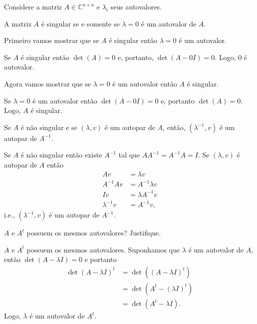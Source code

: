 \documentclass[a4paper,12pt, leqno, answers]{exam}
\begin{document}
\thispagestyle{empty}

\newpage
\setcounter{page}{1}
Considere a matriz $A \in \mathbb{C}^{n \times n}$ e $\lambda_i$ seus autovalores.
\begin{questions}
    \question A matriz $A$ \'{e} singular se e somente se $\lambda = 0$ \'{e} um autovalor de $A$.
    \begin{solution}
        Primeiro vamos mostrar que se $A$ \'{e} singular ent\~{a}o $\lambda = 0$ \'{e} um autovalor.

        Se $A$ \'{e} singular ent\~{a}o $\det(A)=0$ e, portanto, $\det(A - 0I) = 0$. Logo, $0$ \'{e} autovalor.

        Agora vamos mostrar que se $\lambda = 0$ \'{e} um autovalor ent\~{a}o $A$ \'{e} singular.

        Se $\lambda = 0$ \'{e} um autovalor ent\~{a}o $\det(A - 0I) = 0$ e, portanto $\det(A) = 0$. Logo, $A$ \'{e} singular.
    \end{solution}

    \question Se $A$ \'{e} n\~{a}o singular e se $(\lambda, v)$ \'{e} um autopar de $A$, ent\~{a}o, $(\lambda^{-1}, v)$ \'{e} um autopar de $A^{-1}$.
    \begin{solution}
        Se $A$ \'{e} n\~{a}o singular ent\~{a}o existe $A^{-1}$ tal que $A A^{-1} = A^{-1} A = I$. Se $(\lambda, v)$ \'{e} autopar de $A$ ent\~{a}o
        \begin{align*}
            A v &= \lambda v \\
            A^{-1} A v &= A^{-1} \lambda v \\
            I v &= \lambda A^{-1} v \\
            \lambda^{-1} v &= A^{-1} v,
        \end{align*}
        i.e., $(\lambda^{-1}, v)$ \'{e} um autopar de $A^{-1}$.
    \end{solution}

    \question $A$ e $A^t$ possuem os mesmos autovalores? Justifique.
    \begin{solution}
        $A$ e $A^t$ possuem os mesmos autovalores. Suponhamos que $\lambda$ \'{e} um autovalor de $A$, ent\~{a}o $\det(A - \lambda I) = 0$ e portanto
        \begin{align*}
            \det(A - \lambda I)^t &= \det\left( (A - \lambda I)^t \right) \\
            &= \det(A^t - (\lambda I)^t) \\
            &= \det(A^t - \lambda I).
        \end{align*}
        Logo, $\lambda$ \'{e} um autovalor de $A^t$.
    \end{solution}


\end{questions}
\end{document}

